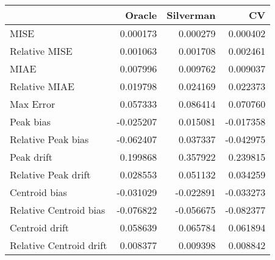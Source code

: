 \begin{tabular}{lrrr}
  \hline
 & Oracle & Silverman & CV \\ 
  \hline
MISE & 0.000173 & 0.000279 & 0.000402 \\ 
  Relative MISE & 0.001063 & 0.001708 & 0.002461 \\ 
  MIAE & 0.007996 & 0.009762 & 0.009037 \\ 
  Relative MIAE & 0.019798 & 0.024169 & 0.022373 \\ 
  Max Error & 0.057333 & 0.086414 & 0.070760 \\ 
  Peak bias & -0.025207 & 0.015081 & -0.017358 \\ 
  Relative Peak bias & -0.062407 & 0.037337 & -0.042975 \\ 
  Peak drift & 0.199868 & 0.357922 & 0.239815 \\ 
  Relative Peak drift & 0.028553 & 0.051132 & 0.034259 \\ 
  Centroid bias & -0.031029 & -0.022891 & -0.033273 \\ 
  Relative Centroid bias & -0.076822 & -0.056675 & -0.082377 \\ 
  Centroid drift & 0.058639 & 0.065784 & 0.061894 \\ 
  Relative Centroid drift & 0.008377 & 0.009398 & 0.008842 \\ 
   \hline
\end{tabular}
